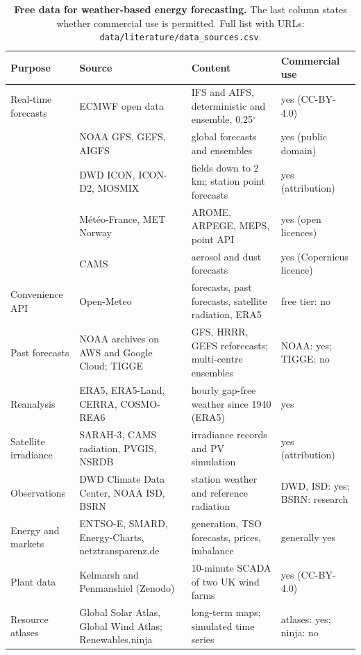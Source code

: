 \begin{table}[t]
\centering\small
\caption{\textbf{Free data for weather-based energy forecasting.} The last column states whether commercial use is permitted. Full list with URLs: \texttt{data/literature/data\_sources.csv}.}
\label{tab:data}
\setlength{\tabcolsep}{4pt}
\begin{tabularx}{\textwidth}{@{}L{2.6cm}L{3.9cm}YL{3.1cm}@{}}
\toprule
Purpose & Source & Content & Commercial use \\
\midrule
Real-time forecasts & ECMWF open data & IFS and AIFS, deterministic and ensemble, 0.25$^\circ$ & yes (CC-BY-4.0) \\
 & NOAA GFS, GEFS, AIGFS & global forecasts and ensembles & yes (public domain) \\
 & DWD ICON, ICON-D2, MOSMIX & fields down to 2\,km; station point forecasts & yes (attribution) \\
 & M\'et\'eo-France, MET Norway & AROME, ARPEGE, MEPS, point API & yes (open licences) \\
 & CAMS & aerosol and dust forecasts & yes (Copernicus licence) \\
Convenience API & Open-Meteo & forecasts, past forecasts, satellite radiation, ERA5 & free tier: no \\
Past forecasts & NOAA archives on AWS and Google Cloud; TIGGE & GFS, HRRR, GEFS reforecasts; multi-centre ensembles & NOAA: yes; TIGGE: no \\
Reanalysis & ERA5, ERA5-Land, CERRA, COSMO-REA6 & hourly gap-free weather since 1940 (ERA5) & yes \\
Satellite irradiance & SARAH-3, CAMS radiation, PVGIS, NSRDB & irradiance records and PV simulation & yes (attribution) \\
Observations & DWD Climate Data Center, NOAA ISD, BSRN & station weather and reference radiation & DWD, ISD: yes; BSRN: research \\
Energy and markets & ENTSO-E, SMARD, Energy-Charts, netztransparenz.de & generation, TSO forecasts, prices, imbalance & generally yes \\
Plant data & Kelmarsh and Penmanshiel (Zenodo) & 10-minute SCADA of two UK wind farms & yes (CC-BY-4.0) \\
Resource atlases & Global Solar Atlas, Global Wind Atlas; Renewables.ninja & long-term maps; simulated time series & atlases: yes; ninja: no \\
\bottomrule
\end{tabularx}
\end{table}
